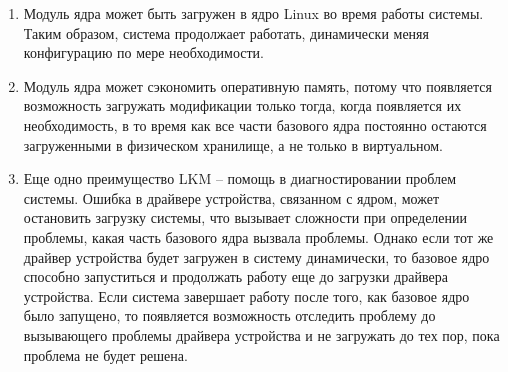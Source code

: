\begin{enumerate}
    \item Модуль ядра может быть загружен в ядро Linux во время работы системы. \vspace{1mm}\\
    Таким образом, система продолжает работать, динамически меняя конфигурацию по мере необходимости.
    \item Модуль ядра может сэкономить оперативную память, потому что появляется возможность загружать модификации только тогда, когда появляется их необходимость, 
    в то время как все части базового ядра постоянно остаются загруженными в физическом хранилище, а не только в виртуальном. \vspace{1mm}\\
    \item Еще одно преимущество LKM -- помощь в диагностировании проблем системы.
    Ошибка в драйвере устройства, связанном с ядром, может остановить загрузку системы, что вызывает сложности при определении проблемы, какая часть базового ядра вызвала проблемы.
    Однако если тот же драйвер устройства будет загружен в систему динамически, 
    то базовое ядро способно запуститься и продолжать работу еще до загрузки драйвера устройства. 
    Если система завершает работу после того, как базовое ядро было запущено, 
    то появляется возможность отследить проблему до вызывающего проблемы драйвера устройства и не загружать до тех пор, пока проблема не будет решена.
\end{enumerate}

